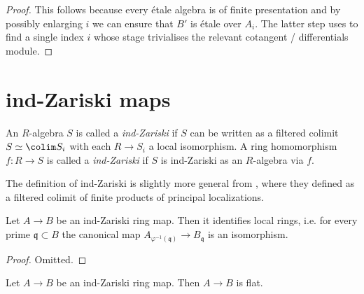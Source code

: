 \begin{proof}
    This follows because every étale algebra is of finite presentation and by possibly enlarging $i$ we can ensure
    that $B'$ is étale over $A_i$. The latter step uses
     to find a single index $i$ whose
    stage trivialises the relevant cotangent / differentials module.
\end{proof}

\section{ind-Zariski maps}

\begin{definition}
    \label{def:ind-Zariski}
    \leanok
    An $R$-algebra $S$ is called a \emph{ind-Zariski} if $S$ can be written as a filtered colimit $S \simeq \colim S_i$ with each $R \to S_i$ a local isomorphism. A ring homomorphism $f : R \to S$ is called a \emph{ind-Zariski} if $S$ is ind-Zariski as an $R$-algebra via $f$.
\end{definition}

\begin{remark}
  The definition of ind-Zariski is slightly more general from \cite[Definition 2.2.1(iv)]{proetale}, where they defined as a filtered colimit of finite products of principal localizations.
\end{remark}

\begin{lemma}
  Let $A \to B$ be an ind-Zariski ring map. Then it identifies local rings, i.e. for every prime 
  $\mathfrak{q} \subset B$ the canonical map $A_{\varphi^{-1}(\mathfrak{q})} \to B_{\mathfrak{q}}$
  is an isomorphism.
  \label{thm:ind-Zariski-identifies-local-rings}
  \leanok
\end{lemma}

\begin{proof}
  Omitted.
\end{proof}

\begin{lemma}
  Let $A \to B$ be an ind-Zariski ring map. Then $A \to B$ is flat.
  \label{thm:ind-Zariski-is-flat}
  \leanok
\end{lemma}

